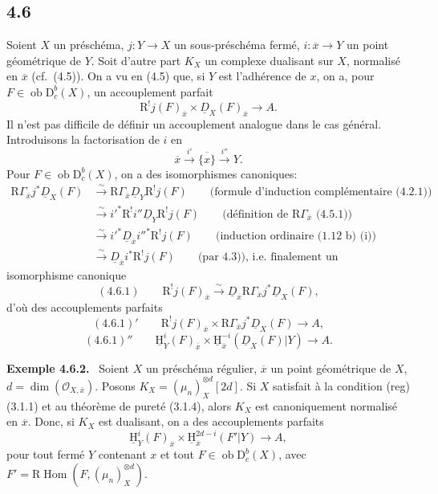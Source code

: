 \documentclass[11pt]{article}
\providecommand{\cO}{\mathcal{O}}
\providecommand{\uH}{\underline{\mathrm H}}
\newenvironment{statement}[1]{\par\medskip\noindent\textbf{#1.}\ }{\par\medskip}
\DeclareMathOperator{\Hom}{Hom}
\newcommand{\R}{\mathrm{R}}\newcommand{\RHomCore}{\mathrm{RHom}}
\newcommand{\D}{\mathrm{D}}
\newcommand{\ob}{\operatorname{ob}}
\newcommand{\ol}[1]{\overline{#1}}
\providecommand{\Hom}{\operatorname{Hom}}
\providecommand{\ob}{\operatorname{ob}}
\providecommand{\R}{\mathrm R}
\providecommand{\Hom}{\operatorname{Hom}}
\begin{document}
\subsection*{4.6}
Soient $X$ un préschéma, $j:Y\to X$ un sous-préschéma fermé, $i:\ol{x}\to Y$ un point géométrique de $Y$. Soit d'autre part $K_X$ un complexe dualisant sur $X$, normalisé en $\ol{x}$ (cf.~(4.5)). On a vu en (4.5) que, si $Y$ est l'adhérence de $x$, on a, pour $F\in\ob\D_c^b(X)$, un accouplement parfait
\[
\R^{!}j(F)_{\ol{x}}\times \underline{D}_X(F)_{\ol{x}}\longrightarrow A.
\]
Il n'est pas difficile de définir un accouplement analogue dans le cas général. Introduisons la factorisation de $i$ en
\[
\ol{x}\xrightarrow{i'}\ol{\{x\}}\xrightarrow{i''}Y.
\]
Pour $F\in\ob\D_c^b(X)$, on a des isomorphismes canoniques:
\[
\begin{aligned}
\R\Gamma_{\ol{x}}j^*\underline{D}_X(F)&\xrightarrow{\sim}\R\Gamma_{\ol{x}}\underline{D}_Y\R^{!}j(F)\qquad\text{(formule d'induction complémentaire (4.2.1))}\\
&\xrightarrow{\sim}i'^*\R^{!}i''\underline{D}_Y\R^{!}j(F)\qquad\text{(définition de $\R\Gamma_{\ol{x}}$ (4.5.1))}\\
&\xrightarrow{\sim}i'^*\underline{D}_{\ol{x}}i''^*\R^{!}j(F)\qquad\text{(induction ordinaire (1.12 b) (i))}\\
&\xrightarrow{\sim}\underline{D}_{\ol{x}}i^*\R^{!}j(F)\qquad\text{(par 4.3)), i.e. finalement un}
\end{aligned}
\]
isomorphisme canonique
\[
(4.6.1)\qquad \R^{!}j(F)_{\ol{x}}\xrightarrow{\sim}\underline{D}_{\ol{x}}\R\Gamma_{\ol{x}}j^*\underline{D}_X(F),
\]
d'où des accouplements parfaits
\[
(4.6.1)'\qquad \R^{!}j(F)_{\ol{x}}\times \R\Gamma_{\ol{x}}j^*\underline{D}_X(F)\longrightarrow A,
\]
\[
(4.6.1)''\qquad \uH_Y^i(F)_{\ol{x}}\times \uH_{\ol{x}}^{-i}(\underline{D}_X(F)|Y)\longrightarrow A.
\]

\begin{statement}{Exemple 4.6.2}
Soient $X$ un préschéma régulier, $\ol{x}$ un point géométrique de $X$, $d=\dim(\cO_{X,\ol{x}})$. Posons $K_X=(\mu_n)_X^{\otimes d}[2d]$. Si $X$ satisfait à la condition (reg) (3.1.1) et au théorème de pureté (3.1.4), alors $K_X$ est canoniquement normalisé en $\ol{x}$. Donc, si $K_X$ est dualisant, on a des accouplements parfaits
\[
\uH_Y^i(F)_{\ol{x}}\times \uH_{\ol{x}}^{2d-i}(F'|Y)\longrightarrow A,
\]
pour tout fermé $Y$ contenant $x$ et tout $F\in\ob\D_c^b(X)$, avec $F'=\R\Hom(F,(\mu_n)_X^{\otimes d})$.
\end{statement}
\end{document}
